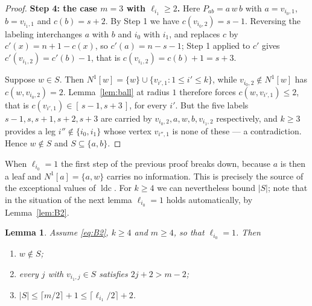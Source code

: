 \documentclass[reqno,10pt]{article}
\newtheorem{lemma}[theorem]{Lemma}
\theoremstyle{definition}
\numberwithin{equation}{section}
\numberwithin{theorem}{section}
\newcommand{\ldc}{\operatorname{ldc}}
\newcommand{\Ball}[2]{N^{#2}[#1]}
\begin{document}
\begin{proof}
\medskip
\noindent\textbf{Step 4: the case $m=3$ with $\ell_{i_1}\ge2$.}
Here $P_{ab}=a\,w\,b$ with $a=v_{i_0,1}$, $b=v_{i_1,1}$ and $c(b)=s+2$. By
Step 1 we have $c(v_{i_0,2})=s-1$. Reversing the labeling interchanges $a$ with
$b$ and $i_0$ with $i_1$, and replaces $c$ by $c'(x)=n+1-c(x)$, so
$c'(a)=n-s-1$; Step 1 applied to $c'$ gives $c'(v_{i_1,2})=c'(b)-1$, that is
$c(v_{i_1,2})=c(b)+1=s+3$.

Suppose $w\in S$. Then $\Ball{w}{1}=\{w\}\cup\{v_{i',1}:1\le i'\le k\}$, while
$v_{i_0,2}\notin\Ball{w}{1}$ has $c(w,v_{i_0,2})=2$. Lemma~\ref{lem:ball} at
radius $1$ therefore forces $c(w,v_{i',1})\le2$, that is
$c(v_{i',1})\in[\,s-1,s+3\,]$, for every $i'$. But the five labels
$s-1,s,s+1,s+2,s+3$ are carried by $v_{i_0,2},a,w,b,v_{i_1,2}$ respectively, and
$k\ge3$ provides a leg $i''\notin\{i_0,i_1\}$ whose vertex $v_{i'',1}$ is none
of these --- a contradiction. Hence $w\notin S$ and $S\subseteq\{a,b\}$.
\end{proof}

When $\ell_{i_0}=1$ the first step of the previous proof breaks down, because
$a$ is then a leaf and $\Ball{a}{1}=\{a,w\}$ carries no information. This is
precisely the source of the exceptional values of $\ldc$. For $k\ge4$ we can
nevertheless bound $|S|$; note that in the situation of the next lemma
$\ell_{i_0}=1$ holds automatically, by Lemma~\ref{lem:B2}.

\begin{lemma}
\label{lem:B2short}
Assume \eqref{eq:B2}, $k\ge4$ and $m\ge4$, so that $\ell_{i_0}=1$. Then
\begin{enumerate}
\item[\textup{(i)}] $w\notin S$;
\item[\textup{(ii)}] every $j$ with $v_{i_1,j}\in S$ satisfies $2j+2>m-2$;
\item[\textup{(iii)}] $|S|\le\lceil m/2\rceil+1\le\lceil \ell_{i_1}/2\rceil+2$.
\end{enumerate}
\end{lemma}
\end{document}
